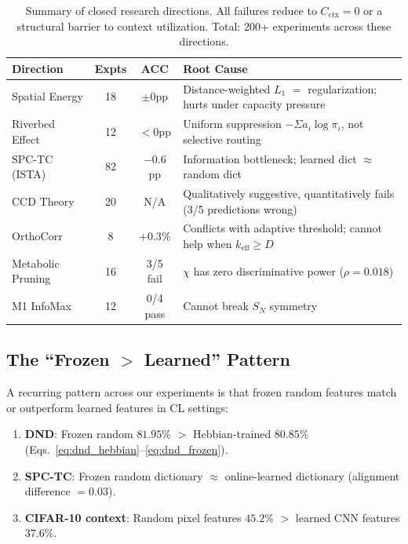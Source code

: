 \documentclass{article}
\begin{document}
\begin{table}[t]
\centering
\caption{Summary of closed research directions. All failures reduce to $C_\mathrm{ctx} = 0$ or a structural barrier to context utilization. Total: 200+ experiments across these directions.}
\label{tab:closed}
\small
\begin{tabular}{lccl}
\toprule
Direction & Expts & ACC & Root Cause \\
\midrule
Spatial Energy        & 18 & $\pm 0$pp & Distance-weighted $L_1$ $=$ regularization; hurts under capacity pressure \\
Riverbed Effect       & 12 & $< 0$pp  & Uniform suppression $-\Sigma a_i \log \pi_i$, not selective routing \\
SPC-TC (ISTA)         & 82 & $-0.6$pp & Information bottleneck; learned dict $\approx$ random dict \\
CCD Theory            & 20 & N/A      & Qualitatively suggestive, quantitatively fails (3/5 predictions wrong) \\
OrthoCorr             & 8  & $+0.3$\% & Conflicts with adaptive threshold; cannot help when $k_\mathrm{eff} \geq D$ \\
Metabolic Pruning     & 16 & 3/5 fail & $\chi$ has zero discriminative power ($\rho = 0.018$) \\
M1 InfoMax            & 12 & 0/4 pass & Cannot break $S_N$ symmetry \\
\bottomrule
\end{tabular}
\end{table}

\subsection{The ``Frozen $>$ Learned'' Pattern}
\label{sec:frozen_learned}

A recurring pattern across our experiments is that frozen random features match or outperform learned features in CL settings:
\begin{enumerate}
    \item \textbf{DND}: Frozen random $81.95\%$ $>$ Hebbian-trained $80.85\%$ (Eqs.~\ref{eq:dnd_hebbian}--\ref{eq:dnd_frozen}).
    \item \textbf{SPC-TC}: Frozen random dictionary $\approx$ online-learned dictionary (alignment difference $= 0.03$).
    \item \textbf{CIFAR-10 context}: Random pixel features $45.2\%$ $>$ learned CNN features $37.6\%$.
\end{enumerate}
\end{document}
